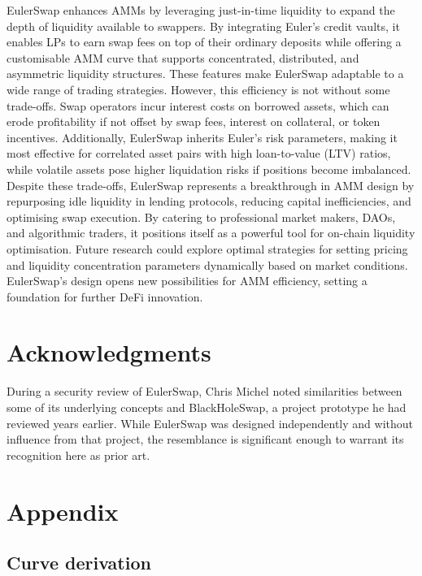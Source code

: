 \documentclass{article}
\begin{document}
EulerSwap enhances AMMs by leveraging just-in-time liquidity to expand the depth of liquidity available to swappers. By integrating Euler’s credit vaults, it enables LPs to earn swap fees on top of their ordinary deposits while offering a customisable AMM curve that supports concentrated, distributed, and asymmetric liquidity structures. These features make EulerSwap adaptable to a wide range of trading strategies. However, this efficiency is not without some trade-offs. Swap operators incur interest costs on borrowed assets, which can erode profitability if not offset by swap fees, interest on collateral, or token incentives. Additionally, EulerSwap inherits Euler’s risk parameters, making it most effective for correlated asset pairs with high loan-to-value (LTV) ratios, while volatile assets pose higher liquidation risks if positions become imbalanced. Despite these trade-offs, EulerSwap represents a breakthrough in AMM design by repurposing idle liquidity in lending protocols, reducing capital inefficiencies, and optimising swap execution. By catering to professional market makers, DAOs, and algorithmic traders, it positions itself as a powerful tool for on-chain liquidity optimisation. Future research could explore optimal strategies for setting pricing and liquidity concentration parameters dynamically based on market conditions. EulerSwap's design opens new possibilities for AMM efficiency, setting a foundation for further DeFi innovation.

\section*{Acknowledgments}

During a security review of EulerSwap, Chris Michel noted similarities between some of its underlying concepts and BlackHoleSwap, a project prototype he had reviewed years earlier. While EulerSwap was designed independently and without influence from that project, the resemblance is significant enough to warrant its recognition here as prior art.

\newpage
\section{Appendix}
\label{sec:appendix}

\subsection{Curve derivation}
\label{sec:curve-derivation}
\end{document}
